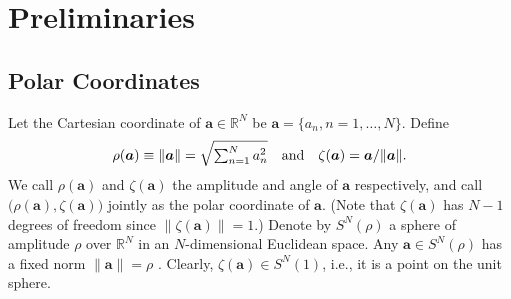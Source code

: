 \documentclass[journal]{IEEEtran}
\newcommand{\BE}{\begin{equation}}
\newcommand{\EE}{\end{equation}}
\renewcommand{\bf}{\bm}
\newtheorem{definition}[theorem]{Definition}
\newcommand{\JM}[1]{\textcolor{blue}{#1}}
\newcommand{\JMC}[1]{\textcolor{magenta}{#1}}
\begin{document}
 





\section{Preliminaries}\label{Sec:Prelim}

\subsection{Polar Coordinates}
Let the Cartesian coordinate of $\bf{a}\in\mathbb{R}^N$ be $\bf{a}=\{a_n, n=1,\dots, N\}$. Define
 \BE
     \rho(\bf{a}) \equiv \|\bf{a}\| = \sqrt{\textstyle\sum_{n=1}^Na_n^2} \quad {\rm and} \quad \zeta(\bf{a})=\bf{a}/\|\bf{a}\|. 
 \EE
We call $\rho(\bf{a})$ and $\zeta(\bf{a})$ the  amplitude and angle of $\bf{a}$ respectively, and call $\big(\rho(\bf{a}), \zeta(\bf{a})\big)$ jointly as the polar coordinate of $\bf{a}$. (Note that $\zeta(\bf{a})$ has $N-1$ degrees of freedom since $\|\zeta(\bf{a})\|=1$.) Denote by $S^N(\rho)$ a sphere of amplitude $\rho$ over $\mathbb{R}^N$ in an $N$-dimensional Euclidean space. Any $\bf{a}\in S^N(\rho)$ has a fixed norm $\|\bf{a}\|=\rho$ \cite{Arfken1985_polar}.  Clearly, $\zeta(\bf{a})\in S^N(1)$, i.e., it is a point on the unit sphere. 
 
\end{document}
